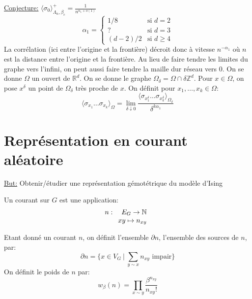 \documentclass[a4paper,12pt]{report}
\begin{document}
\underline{Conjecture:} $\langle \sigma_0 \rangle^+_{\Lambda_n, \beta_c} = \frac{1}{n^{\alpha_1 + o(1)}}$
\newline
\begin{equation*}
\alpha_1 =
\begin{cases}
1/8 & \text{si } d=2 \\
? & \text{si } d=3 \\
(d-2)/2 & \text{si } d \geq 4
\end{cases}
\end{equation*}
\newline
La corrélation (ici entre l'origine et la frontière) décroit donc à vitesse $n^{-\alpha_1}$ où $n$ est la distance entre l'origine et la frontière.
\newline
\newline
Au lieu de faire tendre les limites du graphe vers l'infini, on peut aussi faire tendre la maille dur réseau vers 0. On se donne $\Omega$ un ouvert de $\mathbb{R}^d$. On se donne le graphe $\Omega_{\delta} = \Omega \cap \delta \mathbb{Z}^d$. Pour $x \in \Omega$, on pose $x^{\delta}$ un point de $\Omega_{\delta}$ très proche de $x$. On définit pour $x_1, \dots, x_k \in \Omega$:
$$
\langle \sigma_{x_1} \dots \sigma_{x_k} \rangle_{\Omega} = \lim_{\delta \downarrow 0} \frac{\langle \sigma_{x_1^{\delta}} \dots \sigma_{x_k^{\delta}} \rangle_{\Omega_{\delta}}}{\delta^{k\alpha_1}}
$$

\section{Représentation en courant aléatoire}

\underline{But:} Obtenir/étudier une représentation gémotétrique du modèle d'Ising

\begin{defi}[Courant]
Un courant sur $G$ est une application: 
$$n :\begin{array}[t]{rcl} E_G \rightarrow \mathbb{N} \\ xy \mapsto n_{xy} \end{array}$$
\end{defi}

Etant donné un courant $n$, on définit l'ensemble $\partial n$, l'ensemble des sources de $n$, par:
$$
\partial n = \Big\lbrace x \in V_G \ \vert \ \sum_{y \sim x} n_{xy} \text{ impair} \Big\rbrace
$$
On définit le poids de $n$ par:
$$
w_{\beta}(n) = \prod_{x \sim y} \frac{\beta^{n_{xy}}}{n_{xy}!}
$$
\end{document}
